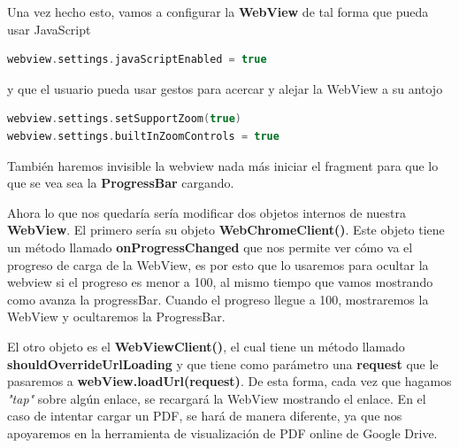 \documentclass[a4paper,11pt]{article}
\begin{document}
\vspace{5 mm}

Una vez hecho esto, vamos a configurar la \textbf{WebView} de tal forma que pueda usar JavaScript 

\vspace{5 mm}


\begin{lstlisting}[language=Kotlin]
webview.settings.javaScriptEnabled = true
\end{lstlisting}

\vspace{5 mm}


y que el usuario pueda usar gestos para acercar y alejar la WebView a su antojo 

\vspace{5 mm}


\begin{lstlisting}[language=Kotlin]
webview.settings.setSupportZoom(true)
webview.settings.builtInZoomControls = true
\end{lstlisting}

\vspace{5 mm}

También haremos invisible la webview nada más iniciar el fragment para que lo que se vea sea la \textbf{ProgressBar} cargando.

\vspace{5 mm}

Ahora lo que nos quedaría sería modificar dos objetos internos de nuestra \textbf{WebView}. El primero sería su objeto \textbf{WebChromeClient()}. Este objeto tiene un método llamado \textbf{onProgressChanged} que nos permite ver cómo va el progreso de carga de la WebView, es por esto que lo usaremos para ocultar la webview si el progreso es menor a 100, al mismo tiempo que vamos mostrando como avanza la progressBar. Cuando el progreso llegue a 100, mostraremos la WebView y ocultaremos la ProgressBar.

\vspace{5 mm}

El otro objeto es el \textbf{WebViewClient()}, el cual tiene un método llamado \textbf{shouldOverrideUrlLoading} y que tiene como parámetro una \textbf{request} que le pasaremos a \textbf{webView.loadUrl(request)}. De esta forma, cada vez que hagamos \textit{"tap"} sobre algún enlace, se recargará la WebView mostrando el enlace. En el caso de intentar cargar un PDF, se hará de manera diferente, ya que nos apoyaremos en la herramienta de visualización de PDF online de Google Drive.
\end{document}
